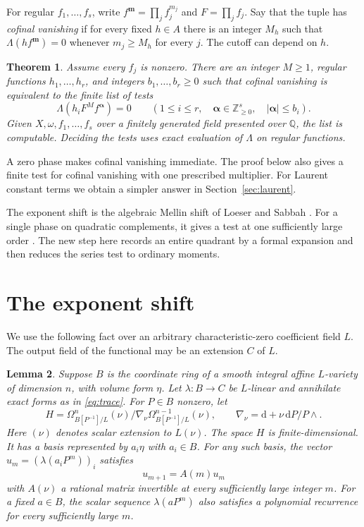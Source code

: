 \documentclass[11pt]{article}
\newtheorem{theorem}{Theorem}
\newtheorem{lemma}[theorem]{Lemma}
\newcommand{\dd}{\mathrm d}
\begin{document}
For regular \(f_1,\ldots,f_s\), write \(f^{\mathbf m}=\prod_j f_j^{m_j}\)
and \(F=\prod_j f_j\). Say that the tuple has \emph{cofinal vanishing}
if for every fixed \(h\in A\) there is an integer \(M_h\) such that
\(\Lambda(hf^{\mathbf m})=0\) whenever \(m_j\ge M_h\) for every \(j\).
The cutoff can depend on \(h\).

\begin{theorem}\label{thm:main}
Assume every \(f_j\) is nonzero. There are an integer \(M\ge1\),
regular functions \(h_1,\ldots,h_r\), and integers \(b_1,\ldots,b_r\ge0\)
such that cofinal vanishing is equivalent to the finite list of tests
\begin{equation}\label{eq:finite-test}
 \Lambda(h_i F^M f^{\boldsymbol\alpha})=0
 \qquad
 (1\le i\le r,\quad
   \boldsymbol\alpha\in\mathbb Z_{\ge0}^s,\quad |\boldsymbol\alpha|\le b_i).
\end{equation}
Given \(X,\omega,f_1,\ldots,f_s\) over a finitely generated field
presented over \(\mathbb Q\), the list is computable. Deciding the
tests uses exact evaluation of \(\Lambda\) on regular functions.
\end{theorem}

A zero phase makes cofinal vanishing immediate. The proof below also
gives a finite test for cofinal vanishing with one prescribed
multiplier. For Laurent constant terms we obtain a simpler answer
in Section~\ref{sec:laurent}.

The exponent shift is the algebraic Mellin shift of Loeser and Sabbah
\cite[\S1.3]{LS}. For a single phase on quadratic complements, it gives
a test at one sufficiently large order \cite{QuadraticComplements}.
The new step here records an entire quadrant by a formal expansion
and then reduces the series test to ordinary moments.

\section{The exponent shift}\label{sec:shift}

We use the following fact over an arbitrary characteristic-zero
coefficient field \(L\). The output field of the functional may be
an extension \(C\) of \(L\).

\begin{lemma}\label{lem:shift}
Suppose \(B\) is the coordinate ring of a smooth integral affine
\(L\)-variety of dimension \(n\), with volume form \(\eta\).
Let \(\lambda:B\to C\) be \(L\)-linear and annihilate exact forms
as in \eqref{eq:trace}. For \(P\in B\) nonzero, let
\[
 H= \Omega^n_{B[P^{-1}]/L}(\nu)
       \big/\nabla_\nu\Omega^{n-1}_{B[P^{-1}]/L}(\nu),
 \qquad
 \nabla_\nu=\dd+\nu\,\dd P/P\wedge .
\]
Here \((\nu)\) denotes scalar extension to \(L(\nu)\).
The space \(H\) is finite-dimensional. It has a basis represented
by \(a_i\eta\) with \(a_i\in B\). For any such basis, the vector
\(u_m=(\lambda(a_iP^m))_i\) satisfies
\[
                     u_{m+1}=A(m)u_m
\]
with \(A(\nu)\) a rational matrix invertible at every sufficiently
large integer \(m\). For a fixed \(a\in B\), the scalar sequence
\(\lambda(aP^m)\) also satisfies a polynomial recurrence for every
sufficiently large \(m\).
\end{lemma}
\end{document}
